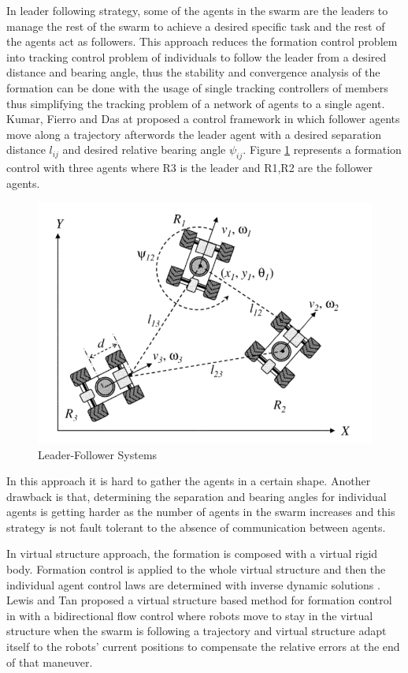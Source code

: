 In leader following strategy, some of the agents in the swarm are the leaders to manage the rest of the swarm to achieve a desired specific task and the rest of the agents act as followers. This approach reduces the formation control problem into tracking control problem of individuals to follow the leader from a desired distance and bearing angle, thus the stability and convergence analysis of the formation can be done with the usage of single tracking controllers of members thus simplifying the tracking problem of a network of agents to a single agent. Kumar, Fierro and Das at \cite{18} proposed a control framework in which follower agents move along a trajectory afterwords the leader agent with a desired separation distance $l_{ij}$ and desired relative bearing angle $\psi_{ij}$.  Figure \ref{leader_follower_ref} represents a formation control with three agents where R3 is the leader and R1,R2 are the follower agents. 

\begin{figure}[H]
	\caption{Leader-Follower Systems \cite{18}} \label{leader_follower_ref}
	\centering
	\includegraphics[scale = 0.5]{leader}
\end{figure}


In this approach it is hard to gather the agents in a certain shape. Another drawback is that, determining the separation and bearing angles for individual agents is getting harder as the number of agents in the swarm increases and this strategy is not fault tolerant to the absence of communication between agents.


In virtual structure approach, the formation is composed with a virtual rigid body. Formation control is applied to the whole virtual structure and then the individual agent control laws are determined with inverse dynamic solutions \cite{12}.  Lewis and Tan proposed a virtual structure based method for formation control in \cite{23} with a bidirectional flow control where robots move to stay in the virtual structure when the swarm is following a trajectory and virtual structure adapt itself to the robots' current positions to compensate the relative errors at the end of that maneuver. 

